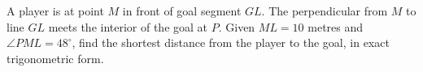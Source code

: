 A player is at point $M$ in front of goal segment $GL$. The perpendicular from $M$ to line $GL$ meets the interior of the goal at $P$. Given $ML=10$ metres and $\angle PML=48^\circ$, find the shortest distance from the player to the goal, in exact trigonometric form.
